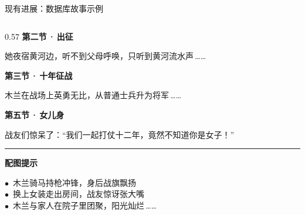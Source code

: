 \documentclass{beamer}
\newcommand{\sidehead}[2][buptred]{%
  {\color{#1}\rule[-0.15em]{2.5pt}{1.0em}}\hspace{0.45em}\textbf{\small\color{darkred}#2}\par
  \vspace{2pt}%
}
\newcommand{\redot}{\textcolor{buptred}{\scriptsize$\bullet$}~}
\begin{document}
\begin{frame}[t]{现有进展：数据库故事示例}
\begin{columns}[T, onlytextwidth]
\begin{column}[T]{0.57\linewidth}
            \textbf{\color{darkred}第二节\,·\,出征}\par
            她夜宿黄河边，听不到父母呼唤，只听到黄河流水声\,\textcolor{gray!70}{……}
            \vspace{3pt}

            \textbf{\color{darkred}第三节\,·\,十年征战}\par
            木兰在战场上英勇无比，从普通士兵升为将军\,\textcolor{gray!70}{……}
            \vspace{3pt}

            \textbf{\color{darkred}第五节\,·\,女儿身}\par
            战友们惊呆了：``我们一起打仗十二年，竟然不知道你是女子！''
            \vspace{6pt}

            \sidehead[accentgold]{配图提示}
            \scriptsize
            \redot 木兰骑马持枪冲锋，身后战旗飘扬\\[1pt]
            \redot 换上女装走出房间，战友惊讶张大嘴\\[1pt]
            \redot 木兰与家人在院子里团聚，阳光灿烂\,\textcolor{gray!70}{……}
        \end{column}
    \end{columns}
\end{frame}
\end{document}

